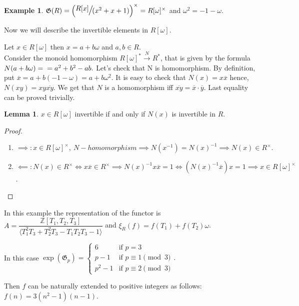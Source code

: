 \documentclass{article}
\theoremstyle{definition}
\newtheorem{example}{Example}
\theoremstyle{definition}
\newtheorem{lemma}{Lemma}
\begin{document}
\begin{example}
    $\mathfrak{G}(R) = \Large{\left( \sfrac{R[x]}{ (x^2+x+1)}\right)^{\times}} = 
    R[\omega]^{\times}$ and $\omega^2 = -1 - \omega$.

Now we will describe the invertible elements in $R[\omega].$

    Let $x \in R[\omega]$ then $x = a + b\omega$ and $a, b \in R$.\\
    Consider the monoid homomorphism $R[\omega]^*  \xrightarrow{\ N\ } R^*$, that is given by the formula $N(a+b\omega) = 
    \\ = a^2 + b^2 - ab.$
    Let's check that N is homomorphism.
    By definition, put $\overline{x} =  a + b(-1 - \omega) = a + b\omega^2 $. It is easy to check that $N(x) = 
    x\overline{x}$ hence, $N(xy) = 
    xy\overline{xy}$.
    We get that $N$ is a homomorphism iff $\overline{xy} = \overline{x}\cdot\overline{y}.$
    Last equality can be proved trivially.

    \begin{lemma}
        $x \in R[\omega]$ invertible if and only if $N(x)$ is invertible in $R$.
    \end{lemma}

    
    \begin{proof}
    \hspace*{5cm}
    \begin{enumerate}
        \item $\implies: x \in R[\omega]^{\times},\ N - homomorphism \implies N(x^{-1}) = N(x)^{-1} \implies N(x)  
        \in R^{\times}.$
        \item $\impliedby:N(x) \in R^{\times} \iff x\overline{x} \in R^{\times} \implies N(x)^{-1}x\overline{x} = 1 
        \iff (N(x)^{-1}\overline{x})x = 1 \implies x \in R[\omega]^{\times}$.
    \end{enumerate}
    \end{proof}

In this example the representation of the functor is $A = \dfrac{\mathbb{Z}[T_1, T_2, T_3]}{\langle 
    T_1^2T_3+T_2^2T_3-T_1T_2T_3-1\rangle}$ and $\xi_R(f)=f(T_1)+f(T_2)\omega$.

In this case $\operatorname{exp}(\mathfrak{G}_p) = \begin{cases} 
    6 & \text{if } p = 3\\
    p - 1 & \text{if } p \equiv 1 \pmod{3}\\
    p^2 - 1 & \text{if } p \equiv 2 \pmod{3}
\end{cases}.$

Then $f$ can be naturally extended to positive integers as follows: $f(n) = 3(n^2 - 1)(n - 1)$.
\end{example}
\end{document}
